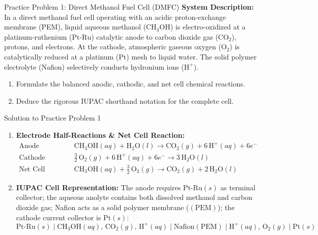 \documentclass[10pt,a4paper]{article}
\begin{document}
\begin{exercisebox}{Practice Problem 1: Direct Methanol Fuel Cell (DMFC)}
\textbf{System Description:}
In a direct methanol fuel cell operating with an acidic proton-exchange membrane (PEM), liquid aqueous methanol ($\text{CH}_3\text{OH}$) is electro-oxidized at a platinum-ruthenium ($\text{Pt-Ru}$) catalytic anode to carbon dioxide gas ($\text{CO}_2$), protons, and electrons. At the cathode, atmospheric gaseous oxygen ($\text{O}_2$) is catalytically reduced at a platinum ($\text{Pt}$) mesh to liquid water. The solid polymer electrolyte (Nafion) selectively conducts hydronium ions ($\text{H}^+$).
\begin{enumerate}[label=(\alph*)]
    \item Formulate the balanced anodic, cathodic, and net cell chemical reactions.
    \item Deduce the rigorous IUPAC shorthand notation for the complete cell.
\end{enumerate}
\end{exercisebox}

\begin{solutionbox}{Solution to Practice Problem 1}
\begin{enumerate}[label=(\alph*)]
    \item \textbf{Electrode Half-Reactions \& Net Cell Reaction:}
    \begin{align*}
        \text{Anode (Oxidation):} \quad & \text{CH}_3\text{OH}(aq) + \text{H}_2\text{O}(l) \longrightarrow \text{CO}_2(g) + 6\,\text{H}^+(aq) + 6e^- \\
        \text{Cathode (Reduction):} \quad & \tfrac{3}{2}\,\text{O}_2(g) + 6\,\text{H}^+(aq) + 6e^- \longrightarrow 3\,\text{H}_2\text{O}(l) \\
        \text{Net Cell Reaction:} \quad & \text{CH}_3\text{OH}(aq) + \tfrac{3}{2}\,\text{O}_2(g) \longrightarrow \text{CO}_2(g) + 2\,\text{H}_2\text{O}(l)
    \end{align*}
    \item \textbf{IUPAC Cell Representation:}
    The anode requires $\text{Pt-Ru}(s)$ as terminal collector; the aqueous anolyte contains both dissolved methanol and carbon dioxide gas; Nafion acts as a solid polymer membrane ($(\text{PEM})$); the cathode current collector is $\text{Pt}(s)$:
    $$\text{Pt-Ru}(s) \mid \text{CH}_3\text{OH}(aq),\, \text{CO}_2(g),\, \text{H}^+(aq) \mid \text{Nafion}(\text{PEM}) \mid \text{H}^+(aq),\, \text{O}_2(g) \mid \text{Pt}(s)$$
\end{enumerate}
\end{solutionbox}
\end{document}
